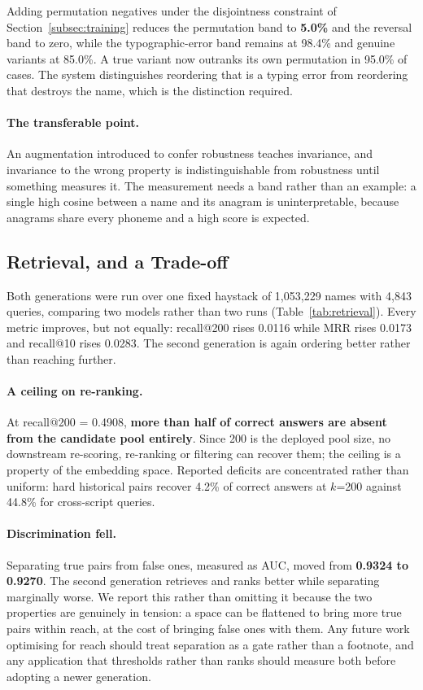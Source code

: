 \documentclass[11pt,a4paper]{article}
\begin{document}
Adding permutation negatives under the disjointness constraint of Section~\ref{subsec:training} reduces the permutation band to \textbf{5.0\%} and the reversal band to zero, while the typographic-error band remains at 98.4\% and genuine variants at 85.0\%. A true variant now outranks its own permutation in 95.0\% of cases. The system distinguishes reordering that is a typing error from reordering that destroys the name, which is the distinction required.

\paragraph{The transferable point.} An augmentation introduced to confer robustness teaches invariance, and invariance to the wrong property is indistinguishable from robustness until something measures it. The measurement needs a band rather than an example: a single high cosine between a name and its anagram is uninterpretable, because anagrams share every phoneme and a high score is expected.

\subsection{Retrieval, and a Trade-off}
\label{subsec:tradeoffs}

Both generations were run over one fixed haystack of 1,053,229 names with 4,843 queries, comparing two models rather than two runs (Table~\ref{tab:retrieval}). Every metric improves, but not equally: recall@200 rises 0.0116 while MRR rises 0.0173 and recall@10 rises 0.0283. The second generation is again ordering better rather than reaching further.

\paragraph{A ceiling on re-ranking.} At recall@200 = 0.4908, \textbf{more than half of correct answers are absent from the candidate pool entirely}. Since 200 is the deployed pool size, no downstream re-scoring, re-ranking or filtering can recover them; the ceiling is a property of the embedding space. Reported deficits are concentrated rather than uniform: hard historical pairs recover 4.2\% of correct answers at $k$=200 against 44.8\% for cross-script queries.

\paragraph{Discrimination fell.} Separating true pairs from false ones, measured as AUC, moved from \textbf{0.9324 to 0.9270}. The second generation retrieves and ranks better while separating marginally worse. We report this rather than omitting it because the two properties are genuinely in tension: a space can be flattened to bring more true pairs within reach, at the cost of bringing false ones with them. Any future work optimising for reach should treat separation as a gate rather than a footnote, and any application that thresholds rather than ranks should measure both before adopting a newer generation.
\end{document}
